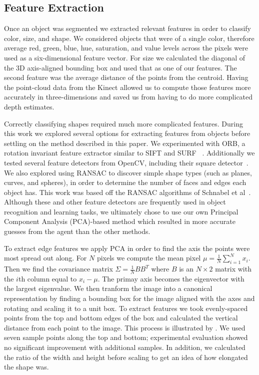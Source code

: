 \documentclass[11pt]{article}
\begin{document}
\subsection{Feature Extraction}

Once an object was segmented we extracted relevant features in order to classify
color, size, and shape. We considered objects that were of a single color, therefore
average red, green, blue, hue, saturation, and value levels across the pixels were
used as a six-dimensional feature vector. For size we calculated the diagonal of the 3D
axis-aligned bounding box and used that as one of our features. The second feature was
the average distance of the points from the centroid. Having the point-cloud data from
the Kinect allowed us to compute those features more accurately in three-dimensions
and saved us from having to do more complicated depth estimates.

Correctly classifying shapes required much more complicated features.
During this work we explored several options for extracting features from
objects before settling on the method described in this paper. We experimented
with ORB, a rotation invariant feature extractor similar to SIFT and SURF
~\cite{rublee2011orb}. Additionally we tested several feature detectors from
OpenCV, including their square detector~\cite{opencv_library}. We also explored
using RANSAC to discover simple shape types (such as planes, curves, and spheres),
in order to determine the number of faces and edges each object has. This work
was based off the RANSAC algorithms of Schnabel et
al~\cite{schnabel2007efficient}. Although these and other feature detectors are
frequently used in object recognition and learning tasks, we ultimately chose to
use our own Principal Component Analysis (PCA)-based method which resulted in more accurate guesses from the
agent than the other methods. 

To extract edge features we apply PCA in order to find the axis the points were most spread out along. 
For $N$ pixels we compute the mean pixel $\mu = \frac{1}{N}\displaystyle\sum_{i=1}^{N}x_i$. Then we find the covariance matrix $\Sigma = \frac{1}{N} BB^T$ where $B$ is an $N\times 2$ matrix with the $i$th column equal to $x_i - \mu$. The primay axis becomes the eigenvector with the largest eigenvalue. We then tranform the image into a canonical representation by finding a bounding box for the image aligned with the axes and rotating and scaling it to a unit box. To extract features we took evenly-spaced
points from the top and bottom edges of the box and calculated the vertical distance
from each point to the image. This process is illustrated by . We used seven
sample points along the top and bottom; experimental evaluation showed no significant
improvement with additional samples. In addition, we calculated the ratio of the width
and height before scaling to get an idea of how elongated the shape was.
\end{document}
